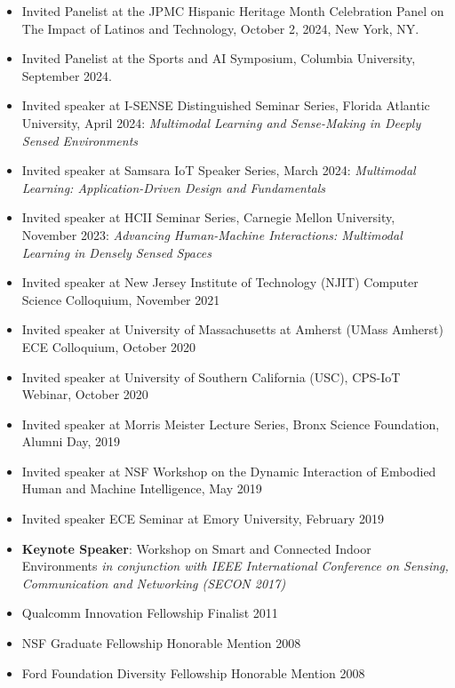 \documentclass[12pt]{article}
\begin{document}
\begin{itemize}
    \item Invited Panelist at the JPMC Hispanic Heritage Month Celebration Panel on The Impact of Latinos and Technology, October 2, 2024, New York, NY.
    \item Invited Panelist at the Sports and AI Symposium, Columbia University, September 2024.
    \item Invited speaker at I-SENSE Distinguished Seminar Series, Florida Atlantic University, April 2024: \emph{Multimodal Learning and Sense-Making in Deeply Sensed Environments}
    \item Invited speaker at Samsara IoT Speaker Series, March 2024: \emph{Multimodal Learning: Application-Driven Design and Fundamentals}
    \item Invited speaker at HCII Seminar Series, Carnegie Mellon University, November 2023: \emph{Advancing Human-Machine Interactions: Multimodal Learning in Densely Sensed Spaces}
    \item Invited speaker at New Jersey Institute of Technology (NJIT) Computer Science Colloquium, November 2021
    \item Invited speaker at University of Massachusetts at Amherst (UMass Amherst) ECE Colloquium, October 2020
    \item Invited speaker at University of Southern California (USC), CPS-IoT Webinar, October 2020
    \item Invited speaker at Morris Meister Lecture Series, Bronx Science Foundation, Alumni Day, 2019
    \item Invited speaker at NSF Workshop on the Dynamic Interaction of Embodied Human and Machine Intelligence, May 2019
    \item Invited speaker ECE Seminar at Emory University, February 2019
    \item {\bf Keynote Speaker}: Workshop on Smart and Connected Indoor Environments \emph{in conjunction with IEEE International Conference on Sensing, Communication and Networking (SECON 2017)}
    \item Qualcomm Innovation Fellowship Finalist 2011
    \item NSF Graduate Fellowship Honorable Mention 2008
    \item Ford Foundation Diversity Fellowship Honorable Mention 2008
\end{itemize}
\end{document}
